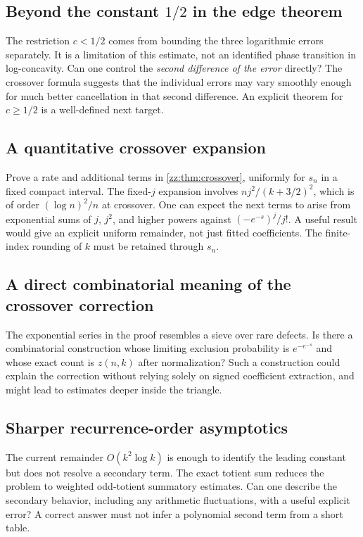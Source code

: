 \documentclass[11pt,a4paper]{article}
\theoremstyle{definition}
\begin{document}
\subsection{Beyond the constant \texorpdfstring{$1/2$}{1/2} in the edge theorem}
The restriction $c<1/2$ comes from bounding the three logarithmic errors
separately.  It is a limitation of this estimate, not an identified phase
transition in log-concavity.  Can one control the \emph{second difference of
the error} directly?  The crossover formula suggests that the individual
errors may vary smoothly enough for much better cancellation in that second
difference.  An explicit theorem for $c\ge1/2$ is a well-defined next target.

\subsection{A quantitative crossover expansion}
Prove a rate and additional terms in \cref{zz:thm:crossover}, uniformly for $s_n$
in a fixed compact interval.  The fixed-$j$ expansion involves
$n j^2/(k+3/2)^2$, which is of order $(\log n)^2/n$ at crossover.
One can expect the next terms to arise from exponential sums of $j$, $j^2$,
and higher powers against $(-e^{-s})^j/j!$.
A useful result would give an explicit uniform remainder, not just fitted
coefficients.  The finite-index rounding of $k$ must be retained through $s_n$.

\subsection{A direct combinatorial meaning of the crossover correction}
The exponential series in the proof resembles a sieve over rare defects.
Is there a combinatorial construction whose limiting exclusion probability
is $e^{-e^{-s}}$ and whose exact count is $z(n,k)$ after normalization?
Such a construction could explain the correction without relying solely on
signed coefficient extraction, and might lead to estimates deeper inside the
triangle.

\subsection{Sharper recurrence-order asymptotics}
The current remainder $O(k^2\log k)$ is enough to identify the leading
constant but does not resolve a secondary term.  The exact totient sum reduces
the problem to weighted odd-totient summatory estimates.
Can one describe the secondary behavior, including any arithmetic
fluctuations, with a useful explicit error?
A correct answer must not infer a polynomial second term from a short table.
\end{document}
